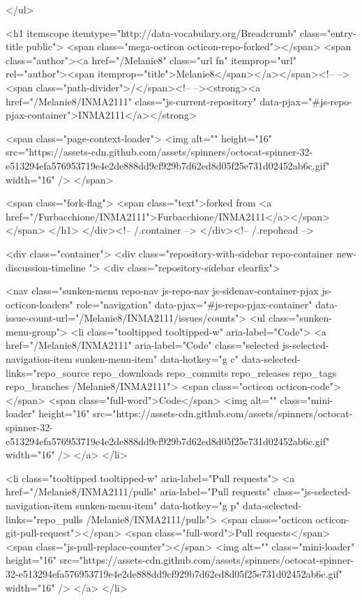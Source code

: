 </ul>

        <h1 itemscope itemtype="http://data-vocabulary.org/Breadcrumb" class="entry-title public">
          <span class="mega-octicon octicon-repo-forked"></span>
          <span class="author"><a href="/Melanie8" class="url fn" itemprop="url" rel="author"><span itemprop="title">Melanie8</span></a></span><!--
       --><span class="path-divider">/</span><!--
       --><strong><a href="/Melanie8/INMA2111" class="js-current-repository" data-pjax="#js-repo-pjax-container">INMA2111</a></strong>

          <span class="page-context-loader">
            <img alt="" height="16" src="https://assets-cdn.github.com/assets/spinners/octocat-spinner-32-e513294efa576953719e4e2de888dd9cf929b7d62ed8d05f25e731d02452ab6c.gif" width="16" />
          </span>

            <span class="fork-flag">
              <span class="text">forked from <a href="/Furbacchione/INMA2111">Furbacchione/INMA2111</a></span>
            </span>
        </h1>
      </div><!-- /.container -->
    </div><!-- /.repohead -->

    <div class="container">
      <div class="repository-with-sidebar repo-container new-discussion-timeline  ">
        <div class="repository-sidebar clearfix">
            
<nav class="sunken-menu repo-nav js-repo-nav js-sidenav-container-pjax js-octicon-loaders"
     role="navigation"
     data-pjax="#js-repo-pjax-container"
     data-issue-count-url="/Melanie8/INMA2111/issues/counts">
  <ul class="sunken-menu-group">
    <li class="tooltipped tooltipped-w" aria-label="Code">
      <a href="/Melanie8/INMA2111" aria-label="Code" class="selected js-selected-navigation-item sunken-menu-item" data-hotkey="g c" data-selected-links="repo_source repo_downloads repo_commits repo_releases repo_tags repo_branches /Melanie8/INMA2111">
        <span class="octicon octicon-code"></span> <span class="full-word">Code</span>
        <img alt="" class="mini-loader" height="16" src="https://assets-cdn.github.com/assets/spinners/octocat-spinner-32-e513294efa576953719e4e2de888dd9cf929b7d62ed8d05f25e731d02452ab6c.gif" width="16" />
</a>    </li>


    <li class="tooltipped tooltipped-w" aria-label="Pull requests">
      <a href="/Melanie8/INMA2111/pulls" aria-label="Pull requests" class="js-selected-navigation-item sunken-menu-item" data-hotkey="g p" data-selected-links="repo_pulls /Melanie8/INMA2111/pulls">
          <span class="octicon octicon-git-pull-request"></span> <span class="full-word">Pull requests</span>
          <span class="js-pull-replace-counter"></span>
          <img alt="" class="mini-loader" height="16" src="https://assets-cdn.github.com/assets/spinners/octocat-spinner-32-e513294efa576953719e4e2de888dd9cf929b7d62ed8d05f25e731d02452ab6c.gif" width="16" />
</a>    </li>


